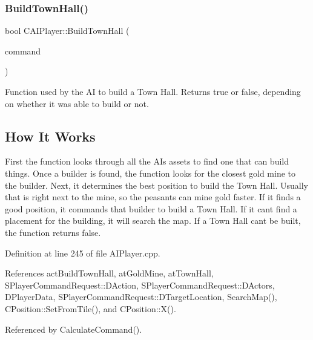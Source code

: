 \subsubsection{\texorpdfstring{Build\+Town\+Hall()}{BuildTownHall()}}
{\footnotesize\ttfamily bool C\+A\+I\+Player\+::\+Build\+Town\+Hall (\begin{DoxyParamCaption}\item[{\hyperlink{structSPlayerCommandRequest}{S\+Player\+Command\+Request} \&}]{command }\end{DoxyParamCaption})\hspace{0.3cm}{\ttfamily [protected]}}



Function used by the AI to build a Town Hall. Returns true or false, depending on whether it was able to build or not. 

\hypertarget{classCAIPlayer_bthhow_sec}{}\subsection{How It Works}\label{classCAIPlayer_bthhow_sec}
First the function looks through all the AI\textquotesingle{}s assets to find one that can build things. Once a builder is found, the function looks for the closest gold mine to the builder. Next, it determines the best position to build the Town Hall. Usually that is right next to the mine, so the peasants can mine gold faster. If it finds a good position, it commands that builder to build a Town Hall. If it can\textquotesingle{}t find a placement for the building, it will search the map. If a Town Hall can\textquotesingle{}t be built, the function returns false. 

Definition at line 245 of file A\+I\+Player.\+cpp.



References act\+Build\+Town\+Hall, at\+Gold\+Mine, at\+Town\+Hall, S\+Player\+Command\+Request\+::\+D\+Action, S\+Player\+Command\+Request\+::\+D\+Actors, D\+Player\+Data, S\+Player\+Command\+Request\+::\+D\+Target\+Location, Search\+Map(), C\+Position\+::\+Set\+From\+Tile(), and C\+Position\+::\+X().



Referenced by Calculate\+Command().


